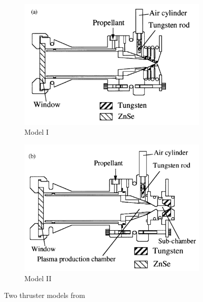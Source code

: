        \begin{figure}[!ht]
            \centering
            \begin{subfigure}[t]{0.45\textwidth}
                \centering
                \includegraphics[width=\textwidth]{assets/2 background/Toyoda apparatus model 1.jpg}
                \caption{Model I}
                \label{fig:Toyoda apparatus 1}
            \end{subfigure}
            \hfill
            \begin{subfigure}[t]{0.45\textwidth}
                \centering
                \includegraphics[width=\textwidth]{assets/2 background/Toyoda Apparatus model 2.png}
                \caption{Model II}
                \label{fig:Toyoda apparatus 2}
            \end{subfigure}
            \caption{Two thruster models from \textcite{toyodaThrustPerformanceCW2002}}
            \label{fig:Toyoda apparatussies}
        \end{figure}

